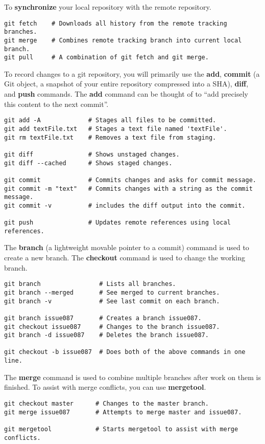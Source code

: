 To \textbf{synchronize} your local repository with the remote repository.
\begin{lstlisting}
git fetch    # Downloads all history from the remote tracking branches.
git merge    # Combines remote tracking branch into current local branch. 
git pull     # A combination of git fetch and git merge.
\end{lstlisting}

To record changes to a git repository, you will primarily use the \textbf{add}, \textbf{commit} (a Git object, a snapshot of your entire repository compressed into a SHA), \textbf{diff}, and \textbf{push} commands. The \textbf{add} command can be thought of to ``add precisely this content to the next commit''. 
\begin{lstlisting}
git add -A             # Stages all files to be committed.
git add textFile.txt   # Stages a text file named 'textFile'.
git rm textFile.txt    # Removes a text file from staging.

git diff               # Shows unstaged changes.
git diff --cached      # Shows staged changes.

git commit             # Commits changes and asks for commit message.
git commit -m "text"   # Commits changes with a string as the commit message.
git commit -v          # includes the diff output into the commit.

git push               # Updates remote references using local references.
\end{lstlisting}




The \textbf{branch} (a lightweight movable pointer to a commit) command is used to create a new branch. The \textbf{checkout} command is used to change the working branch.
\begin{lstlisting}
git branch                # Lists all branches.
git branch --merged       # See merged to current branches.
git branch -v             # See last commit on each branch.

git branch issue087       # Creates a branch issue087.
git checkout issue087     # Changes to the branch issue087.
git branch -d issue087    # Deletes the branch issue087.

git checkout -b issue087  # Does both of the above commands in one line.
\end{lstlisting}

The \textbf{merge} command is used to combine multiple branches after work on them is finished. To assist with merge conflicts, you can use \textbf{mergetool}.
\begin{lstlisting}
git checkout master      # Changes to the master branch.
git merge issue087       # Attempts to merge master and issue087.

git mergetool            # Starts mergetool to assist with merge conflicts.
\end{lstlisting}

